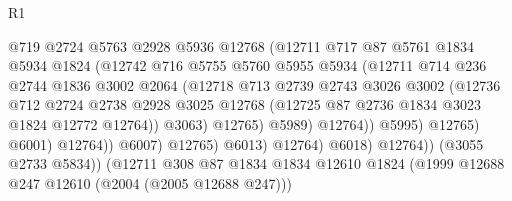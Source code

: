 \begin{lexlean}{R1}
\begin{coremodule}
                                    @719
                                    @2724
                                    @5763
                                    @2928
                                    @5936
                                    @12768
                                    (@12711
                                      @717
                                      @87
                                      @5761
                                      @1834
                                      @5934
                                      @1824
                                      (@12742
                                        @716
                                        @5755
                                        @5760
                                        @5955
                                        @5934
                                        (@12711
                                          @714
                                          @236
                                          @2744
                                          @1836
                                          @3002
                                          @2064
                                          (@12718
                                            @713
                                            @2739
                                            @2743
                                            @3026
                                            @3002
                                            (@12736
                                              @712
                                              @2724
                                              @2738
                                              @2928
                                              @3025
                                              @12768
                                              (@12725 @87 @2736 @1834 @3023 @1824 @12772 @12764))
                                            @3063)
                                          @12765)
                                        @5989)
                                      @12764))
                                  @5995)
                                @12765)
                              @6001)
                            @12764))
                        @6007)
                      @12765)
                    @6013)
                  @12764)
                @6018)
              @12764))
          (@3055 @2733 @5834))
        (@12711
          @308
          @87
          @1834
          @1834
          @12610
          @1824
          (@1999 @12688 @247 @12610 (@2004 (@2005 @12688 @247)))

\end{coremodule}
\end{lexlean}
